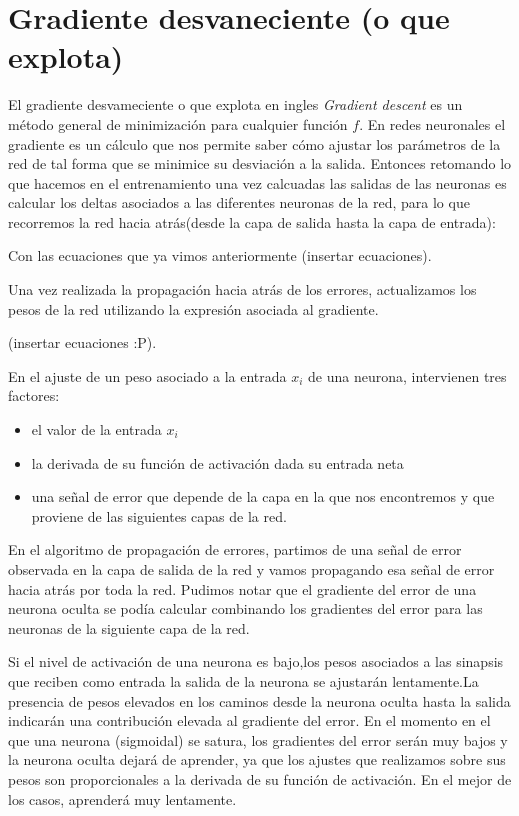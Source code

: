 \section{Gradiente desvaneciente (o que explota)}

El gradiente desvameciente o que explota en ingles \emph{Gradient descent} es un método general de minimización para cualquier función $f$. En redes neuronales el gradiente es un cálculo que nos permite saber cómo ajustar los parámetros de la red de tal forma que se minimice su desviación a la salida.
Entonces retomando lo que hacemos en el entrenamiento una vez calcuadas las salidas de las neuronas es calcular los deltas asociados a las diferentes neuronas de la red, para lo que recorremos la red hacia atrás(desde la capa de salida hasta la capa de entrada):

Con las ecuaciones que ya vimos anteriormente (insertar ecuaciones).

Una vez realizada la propagación hacia atrás de los errores, actualizamos los pesos de la red utilizando la expresión asociada al gradiente.

(insertar ecuaciones :P).

En el ajuste de un peso asociado a la entrada $x_i$ de una neurona, intervienen tres factores: 
\begin{itemize}
 \item el valor de la entrada $x_i$
 \item la derivada de su función de activación dada su entrada neta
 \item una señal de error que depende de la capa en la que nos encontremos y que proviene de las
siguientes capas de la red.
\end{itemize}

En el algoritmo de propagación de errores, partimos de una señal de error observada en la capa de salida de la red y vamos propagando esa señal de error hacia atrás por toda la red. Pudimos notar que el gradiente del error de una neurona oculta se podía calcular combinando los gradientes del error para las neuronas de la siguiente capa de la red.

Si el nivel de activación de una neurona es bajo,los pesos asociados a las sinapsis que reciben como entrada la salida
de la neurona se ajustarán lentamente.La presencia de pesos elevados en los caminos desde la neurona oculta
hasta la salida indicarán una contribución elevada al gradiente del error. En el momento en el que una neurona (sigmoidal) se satura, los gradientes del error serán muy bajos y la neurona oculta dejará de aprender, ya que los ajustes que realizamos sobre sus pesos son proporcionales a la derivada de su función de activación. En el mejor de los casos, aprenderá muy lentamente.

